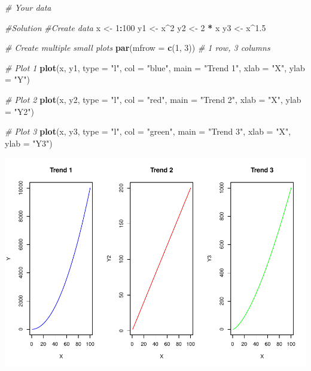 \documentclass[
]{book}
\newenvironment{Shaded}{\begin{snugshade}}{\end{snugshade}}
\newcommand{\AttributeTok}[1]{\textcolor[rgb]{0.13,0.29,0.53}{#1}}
\newcommand{\CommentTok}[1]{\textcolor[rgb]{0.56,0.35,0.01}{\textit{#1}}}
\newcommand{\DecValTok}[1]{\textcolor[rgb]{0.00,0.00,0.81}{#1}}
\newcommand{\FloatTok}[1]{\textcolor[rgb]{0.00,0.00,0.81}{#1}}
\newcommand{\FunctionTok}[1]{\textcolor[rgb]{0.13,0.29,0.53}{\textbf{#1}}}
\newcommand{\NormalTok}[1]{#1}
\newcommand{\OtherTok}[1]{\textcolor[rgb]{0.56,0.35,0.01}{#1}}
\newcommand{\SpecialCharTok}[1]{\textcolor[rgb]{0.81,0.36,0.00}{\textbf{#1}}}
\newcommand{\StringTok}[1]{\textcolor[rgb]{0.31,0.60,0.02}{#1}}
\begin{document}
\begin{Shaded}
\begin{Highlighting}[]
\CommentTok{\# Your  data}

\CommentTok{\#Solution}
\CommentTok{\#Create data}
\NormalTok{x }\OtherTok{\textless{}{-}} \DecValTok{1}\SpecialCharTok{:}\DecValTok{100}
\NormalTok{y1 }\OtherTok{\textless{}{-}}\NormalTok{ x}\SpecialCharTok{\^{}}\DecValTok{2}
\NormalTok{y2 }\OtherTok{\textless{}{-}} \DecValTok{2} \SpecialCharTok{*}\NormalTok{ x}
\NormalTok{y3 }\OtherTok{\textless{}{-}}\NormalTok{ x}\SpecialCharTok{\^{}}\FloatTok{1.5}

\CommentTok{\# Create multiple small plots}
\FunctionTok{par}\NormalTok{(}\AttributeTok{mfrow =} \FunctionTok{c}\NormalTok{(}\DecValTok{1}\NormalTok{, }\DecValTok{3}\NormalTok{)) }\CommentTok{\# 1 row, 3 columns}

\CommentTok{\# Plot 1}
\FunctionTok{plot}\NormalTok{(x, y1, }\AttributeTok{type =} \StringTok{"l"}\NormalTok{, }\AttributeTok{col =} \StringTok{"blue"}\NormalTok{, }\AttributeTok{main =} \StringTok{"Trend 1"}\NormalTok{, }\AttributeTok{xlab =} \StringTok{"X"}\NormalTok{, }\AttributeTok{ylab =} \StringTok{"Y"}\NormalTok{)}

\CommentTok{\# Plot 2}
\FunctionTok{plot}\NormalTok{(x, y2, }\AttributeTok{type =} \StringTok{"l"}\NormalTok{, }\AttributeTok{col =} \StringTok{"red"}\NormalTok{, }\AttributeTok{main =} \StringTok{"Trend 2"}\NormalTok{, }\AttributeTok{xlab =} \StringTok{"X"}\NormalTok{, }\AttributeTok{ylab =} \StringTok{"Y2"}\NormalTok{)}

\CommentTok{\# Plot 3}
\FunctionTok{plot}\NormalTok{(x, y3, }\AttributeTok{type =} \StringTok{"l"}\NormalTok{, }\AttributeTok{col =} \StringTok{"green"}\NormalTok{, }\AttributeTok{main =} \StringTok{"Trend 3"}\NormalTok{, }\AttributeTok{xlab =} \StringTok{"X"}\NormalTok{, }\AttributeTok{ylab =} \StringTok{"Y3"}\NormalTok{)}
\end{Highlighting}
\end{Shaded}

\includegraphics{_main_files/figure-latex/unnamed-chunk-50-1.pdf}
\end{document}

